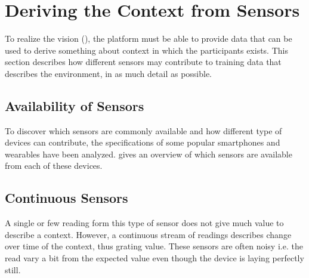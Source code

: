 
\section{Deriving the Context from Sensors}
\label{sec:deriving_the_context_from_sensors}

To realize the vision (), the platform must be able to provide data that can be used to derive something about context in which the participants exists. This section describes how different sensors may contribute to training data that describes the environment, in as much detail as possible. 

\subsection{Availability of Sensors}
To discover which sensors are commonly available and how different type of devices can contribute, the specifications of some popular smartphones and wearables have been analyzed.  gives an overview of which sensors are available from each of these devices. 



\subsection{Continuous Sensors}
A single or few reading form this type of sensor does not give much value to describe a context. However, a continuous stream of readings describes change over time of the context, thus grating value. These sensors are often noisy i.e. the read vary a bit from the expected value even though the device is laying perfectly still.


